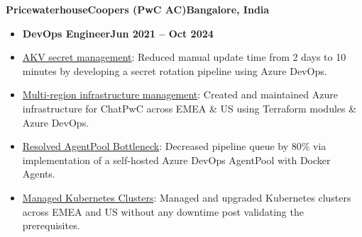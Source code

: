 \documentclass[11pt,a4paper]{article}
\newenvironment{dashlist}{
  \begin{itemize}[label={--}]
}{
  \end{itemize}
}
\begin{document}
\medskip

\noindent\textbf{PricewaterhouseCoopers (PwC AC)\hfill Bangalore, India}
\begin{itemize}
\item \textbf{DevOps Engineer\hfill Jun 2021 – Oct 2024}
\end{itemize}
\begin{dashlist}
    \item \uline {AKV secret management}: Reduced manual update time from 2 days to 10 minutes by developing a secret rotation pipeline using Azure DevOps.
    \item \uline {Multi-region infrastructure management}: Created and maintained Azure infrastructure for ChatPwC across EMEA \& US using Terraform modules \& Azure DevOps.
    \item \uline {Resolved AgentPool Bottleneck}: Decreased pipeline queue by 80\% via implementation of a self-hosted Azure DevOps AgentPool with Docker Agents.
    \item \uline {Managed Kubernetes Clusters}: Managed and upgraded Kubernetes clusters across EMEA and US without any downtime post validating the prerequisites.

\end{dashlist}
\end{document}

